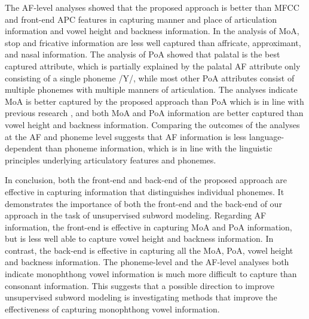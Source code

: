 \documentclass[transmag]{IEEEtran}
\begin{document}
The  AF-level analyses showed that the proposed approach is better than MFCC and front-end APC features in capturing manner and place of articulation information and vowel height and backness information. In the analysis of MoA, stop and fricative information are less well captured than affricate, approximant, and nasal information. The analysis of PoA showed that palatal is the best captured attribute, which is partially explained by the palatal AF attribute only consisting of a single phoneme /Y/, while most other PoA attributes consist of multiple phonemes with multiple manners of articulation. The analyses indicate MoA is better captured by the proposed approach than PoA which is in line with previous research \cite{ScharenborgGLM19representations}, and both MoA and PoA information are better captured than vowel height and backness information. Comparing the outcomes of the analyses at the AF and phoneme level suggests that AF information is less language-dependent than phoneme information, which is in line with the linguistic principles underlying articulatory features and phonemes.

In conclusion, both the front-end and back-end of the proposed approach are effective in capturing information that distinguishes individual phonemes. It demonstrates the importance of both the front-end and the back-end of our approach in the task of unsupervised subword modeling.  Regarding AF information, the front-end is effective in capturing MoA and PoA information, but is less well able to capture vowel height and backness information. In contrast, the back-end is effective in capturing all the MoA, PoA, vowel height and backness information. The phoneme-level and the AF-level analyses both indicate monophthong vowel information is much more difficult to capture than consonant information. This suggests that a possible direction to improve unsupervised subword modeling is investigating methods that improve the effectiveness of capturing monophthong vowel information. 



\end{document}
